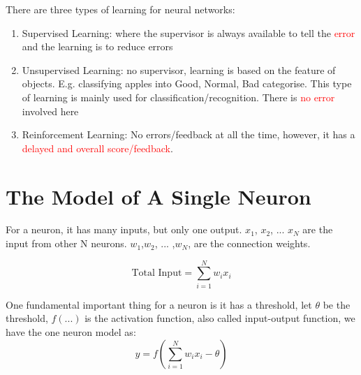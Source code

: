 There are three types of learning for neural networks:
\begin{enumerate}
    \item Supervised Learning: where the supervisor is always available to tell the \textcolor{red}{error} and the learning is to reduce errors
    \item Unsupervised Learning: no supervisor, learning is based on the feature of objects. E.g. classifying apples into Good, Normal, Bad categorise. This type of learning is mainly used for classification/recognition. There is \textcolor{red}{no error} involved here
    \item Reinforcement Learning: No errors/feedback at all the time, however, it has a \textcolor{red}{delayed and overall score/feedback}.
\end{enumerate}
\noindent{\color{red} \rule{\linewidth}{0.5mm}}


\section{The Model of A Single Neuron}
For a neuron, it has many inputs, but only one output. \(x_1\), \(x_2\), ... \(x_N\) are the input from other N neurons. \(w_1\),\(w_2\), ... ,\(w_N\),  are the connection weights.

\begin{equation}
  \textrm{Total Input} = \sum_{i=1}^{N} w_i x_i   
\end{equation}

\begin{center}
\end{center}
One fundamental important thing for a neuron is it has a threshold, let $\theta$ be the threshold, $f(...)$ is the activation function, also called input-output function, we have the one neuron model as:
\begin{equation}
 y = f(\sum_{i=1}^{N} w_i x_i - \theta)  
\end{equation}
\noindent{\color{red} \rule{\linewidth}{0.5mm}}
